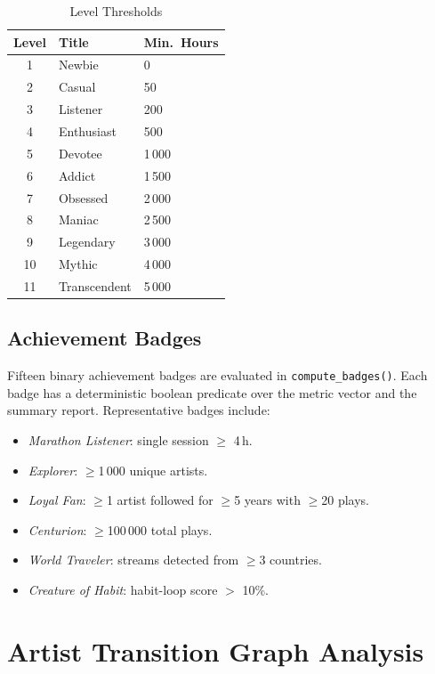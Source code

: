 \documentclass[conference]{IEEEtran}
\newcommand{\tabletight}{\footnotesize\setlength{\tabcolsep}{3.5pt}\renewcommand{\arraystretch}{1.08}}
\begin{document}
\begin{table}[!t]
\caption{Level Thresholds}
\label{tab:levels}
\centering
\tabletight
\begin{tabular}{cll}
\toprule
\textbf{Level} & \textbf{Title} & \textbf{Min.\ Hours} \\
\midrule
1  & Newbie       & 0 \\
2  & Casual       & 50 \\
3  & Listener     & 200 \\
4  & Enthusiast   & 500 \\
5  & Devotee      & 1\,000 \\
6  & Addict       & 1\,500 \\
7  & Obsessed     & 2\,000 \\
8  & Maniac       & 2\,500 \\
9  & Legendary    & 3\,000 \\
10 & Mythic       & 4\,000 \\
11 & Transcendent & 5\,000 \\
\bottomrule
\end{tabular}
\end{table}

\subsection{Achievement Badges}

Fifteen binary achievement badges are evaluated in \texttt{compute\_badges()}.
Each badge has a deterministic boolean predicate over the metric vector and
the summary report. Representative badges include:
\begin{itemize}
  \item \textit{Marathon Listener}: single session $\geq$ 4\,h.
  \item \textit{Explorer}: $\geq$1\,000 unique artists.
  \item \textit{Loyal Fan}: $\geq$1 artist followed for $\geq$5 years with
        $\geq$20 plays.
  \item \textit{Centurion}: $\geq$100\,000 total plays.
  \item \textit{World Traveler}: streams detected from $\geq$3 countries.
  \item \textit{Creature of Habit}: habit-loop score $>$ 10\%.
\end{itemize}

\section{Artist Transition Graph Analysis}
\end{document}
